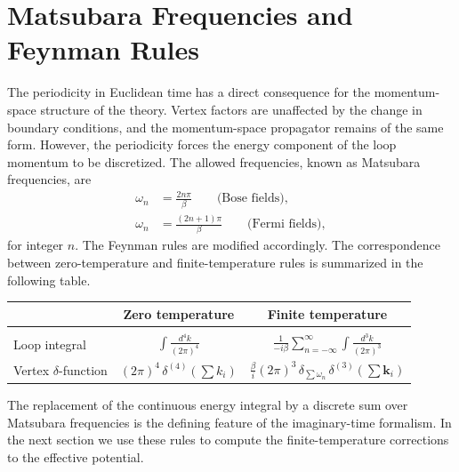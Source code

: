 \section{Matsubara Frequencies and Feynman Rules}

The periodicity in Euclidean time has a direct consequence for the
momentum-space structure of the theory. Vertex factors are unaffected by
the change in boundary conditions, and the momentum-space propagator
remains of the same form. However, the periodicity forces the
energy component of the loop momentum to be discretized. The allowed
frequencies, known as Matsubara frequencies, are
\begin{align}
	\omega_n & = \frac{2n\pi}{\beta}
	\qquad\text{(Bose fields)},          \\
	\omega_n & = \frac{(2n+1)\pi}{\beta}
	\qquad\text{(Fermi fields)},
\end{align}
for integer $n$. The Feynman rules are modified accordingly. The
correspondence between zero-temperature and finite-temperature rules is
summarized in the following table.

\begin{center}
	\begin{tabular}{lcc}
		 & Zero temperature                                                     & Finite temperature \\[6pt]
		\hline                                                                                       \\
		Loop integral
		 & $\displaystyle\int\frac{d^4k}{(2\pi)^4}$
		 & $\displaystyle\frac{1}{-i\beta}\sum_{n=-\infty}^{\infty}
			   \int\frac{d^3k}{(2\pi)^3}$                                   \\[12pt]
		Vertex $\delta$-function
		 & $(2\pi)^4\,\delta^{(4)}\!\left(\sum k_i\right)$
		 & $\displaystyle\frac{\beta}{i}(2\pi)^3\,
			   \delta_{\sum\omega_n}\,\delta^{(3)}\!\left(\sum\mathbf{k}_i\right)$
		\\[6pt]
		\hline
	\end{tabular}
\end{center}

The replacement of the continuous energy integral by a discrete sum over
Matsubara frequencies is the defining feature of the imaginary-time
formalism. In the next section we use these rules to compute the
finite-temperature corrections to the effective potential.


